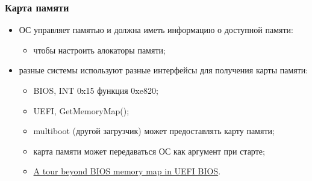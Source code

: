 \begin{frame}
\frametitle{Карта памяти}
\begin{itemize}
  \item ОС управляет памятью и должна иметь информацию о доступной памяти:
  \begin{itemize}
    \item чтобы настроить алокаторы памяти;
  \end{itemize}
  \item разные системы используют разные интерфейсы для получения карты памяти:
  \begin{itemize}
    \item BIOS, INT 0x15 функция 0xe820;
    \item UEFI, GetMemoryMap();
    \item multiboot (другой загрузчик) может предоставлять карту памяти;
    \item карта памяти может передаваться ОС как аргумент при старте;
    \item \href{https://firmware.intel.com/sites/default/files/resources/A_Tour_Beyond_BIOS_Memory_Map_in\%20UEFI_BIOS.pdf}{A tour beyond BIOS memory map in UEFI BIOS}.
  \end{itemize}
\end{itemize}
\end{frame}
